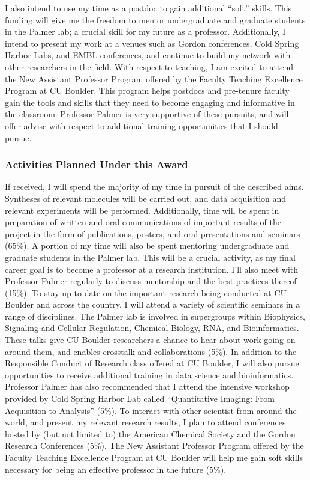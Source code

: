 \documentclass{F32}
\begin{document}

I also intend to use my time as a postdoc to gain additional ``soft'' skills. This funding will give me the freedom to mentor undergraduate and graduate students in the Palmer lab; a crucial skill for my future as a professor. Additionally, I intend to present my work at a venues such as Gordon conferences, Cold Spring Harbor Labs, and EMBL conferences, and continue to build my network with other researchers in the field. With respect to teaching, I am excited to attend the New Assistant Professor Program offered by the Faculty Teaching Excellence Program at CU Boulder. This program helps postdocs and pre-tenure faculty gain the tools and skills that they need to become engaging and informative in the classroom. Professor Palmer is very supportive of these pursuits, and will offer advise with respect to additional training opportunities that I should pursue.

\subsubsection*{Activities Planned Under this Award}
If received, I will spend the majority of my time in pursuit of the described aims. Syntheses of relevant molecules will be carried out, and data acquisition and relevant experiments will be performed. Additionally, time will be spent in preparation of written and oral communications of important results of the project in the form of publications, posters, and oral presentations and seminars (65\%).
A portion of my time will also be spent mentoring undergraduate and graduate students in the Palmer lab. This will be a crucial activity, as my final career goal is to become a professor at a research institution. I'll also meet with Professor Palmer regularly to discuss mentorship and the best practices thereof (15\%).
To stay up-to-date on the important research being conducted at CU Boulder and across the country, I will attend a variety of scientific seminars in a range of disciplines. The Palmer lab is involved in supergroups within Biophysics, Signaling and Cellular Regulation, Chemical Biology, RNA, and Bioinformatics. These talks give CU Boulder researchers a chance to hear about work going on around them, and enables crosstalk and collaborations (5\%).
In addition to the Responsible Conduct of Research class offered at CU Boulder, I will also pursue opportunities to receive additional training in data science and bioinformatics. Professor Palmer has also recommended that I attend the intensive workshop provided by Cold Spring Harbor Lab called ``Quantitative Imaging: From Acquisition to Analysis'' (5\%).
To interact with other scientist from around the world, and present my relevant research results, I plan to attend conferences hosted by (but not limited to) the American Chemical Society and the Gordon Research Conferences (5\%).
The New Assistant Professor Program offered by the Faculty Teaching Excellence Program at CU Boulder will help me gain soft skills necessary for being an effective professor in the future (5\%).
\end{document}

